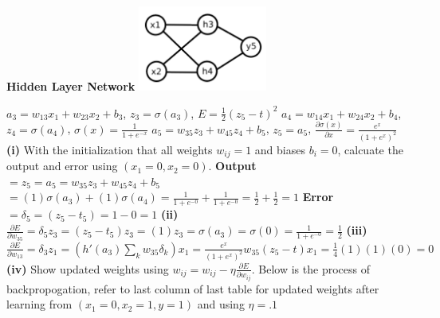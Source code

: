 \documentclass[12pt,twoside]{article}
\newcommand{\tabUnit}{3ex}
\newcommand{\tabT}{\hspace*{\tabUnit}}
\begin{document}
\begin{center}
\tabT\tabT\tabT\tabT\tabT\textbf{Hidden Layer Network}
\newline
{}
\includegraphics[width = 120pt]{XOR_hiddenL}
\end{center}
$a_{3} = w_{13}x_{1} + w_{23}x_{2} + b_{3}$, \tabT\tabT
$z_{3} = \sigma(a_{3})$, \tabT\tabT
$E = \frac{1}{2}(z_{5} - t)^2$
\newline
$a_{4} = w_{14}x_{1} + w_{24}x_{2} + b_{4}$, \tabT\tabT
$z_{4} = \sigma(a_{4})$, \tabT\tabT
$\sigma(x) = \frac{1}{1+e^{-x}}$
\newline
$a_{5} = w_{35}z_{3} + w_{45}z_{4} + b_{5}$, \tabT\tabT
$z_{5} = a_{5}$, \tabT\tabT\tabT
$\frac{\partial \sigma(x)}{\partial x} = \frac{e^x}{(1+e^{x})^2}$
\newline
\newline
\tabT\textbf{(i)} With the initialization that all weights $w_{ij} = 1$ and biases $b_{i} = 0$, calcuate the output and error using $(x_{1} = 0, x_{2} = 0)$.
\newline
\tabT \textbf{Output} $= z_{5} = a_{5} = w_{35}z_{3} + w_{45}z_{4} + b_{5}$
$= (1)\sigma(a_{3}) + (1)\sigma(a_{4}) = \frac{1}{1+e^{-0}} + \frac{1}{1+e^{-0}} = \frac{1}{2} + \frac{1}{2} = 1$
\newline
\tabT \textbf{Error} $= \delta_{5} = (z_{5} - t_{5}) = 1 - 0 = 1$
\newline
\newline
\tabT\textbf{(ii)} $\frac{\partial E}{\partial w_{35}} = \delta_{5}z_{3} = (z_{5} - t_{5})z_{3} = (1)z_{3} = \sigma(a_{3}) = \sigma(0) = \frac{1}{1+e^{-0}} = \frac{1}{2}$
\newline
\newline
\tabT\textbf{(iii)} $\frac{\partial E}{\partial w_{13}} = \delta_{3}z_{1} = (h'(a_{3})\sum_{k} w_{35}\delta_{k})x_{1} = \frac{e^x}{(1+e^{x})^2}w_{35}(z_{5}-t)x_{1} = \frac{1}{4}(1)(1)(0) = 0$
\newline
\newline
\tabT\textbf{(iv)} Show updated weights using $w_{ij} = w_{ij} - \eta\frac{\partial E}{\partial w_{ij}}$.  Below is the process of backpropogation, refer to last column of last table for updated weights after learning from $(x_{1} = 0, x_{2} = 1, y=1)$ and using $\eta = .1$
\end{document}

